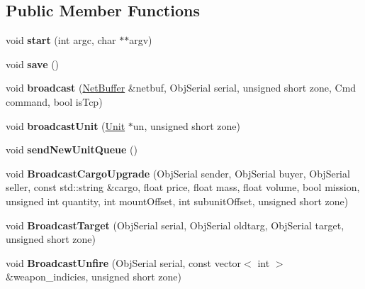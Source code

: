 \subsection*{Public Member Functions}
\begin{DoxyCompactItemize}
\item 
void {\bfseries start} (int argc, char $\ast$$\ast$argv)\hypertarget{classNetServer_aee9eb56b19a071d78e6c2a1ec2e3d8e1}{}\label{classNetServer_aee9eb56b19a071d78e6c2a1ec2e3d8e1}

\item 
void {\bfseries save} ()\hypertarget{classNetServer_a842548b6e1b57b7d67b1345eff098a3c}{}\label{classNetServer_a842548b6e1b57b7d67b1345eff098a3c}

\item 
void {\bfseries broadcast} (\hyperlink{classNetBuffer}{Net\+Buffer} \&netbuf, Obj\+Serial serial, unsigned short zone, Cmd command, bool is\+Tcp)\hypertarget{classNetServer_a2b22e7150100d83f61d56405aefb91c7}{}\label{classNetServer_a2b22e7150100d83f61d56405aefb91c7}

\item 
void {\bfseries broadcast\+Unit} (\hyperlink{classUnit}{Unit} $\ast$un, unsigned short zone)\hypertarget{classNetServer_ae4617ac1961bb0ba10c510c53da711f6}{}\label{classNetServer_ae4617ac1961bb0ba10c510c53da711f6}

\item 
void {\bfseries send\+New\+Unit\+Queue} ()\hypertarget{classNetServer_aca38f088430e71d1ba1c31751a3e11ec}{}\label{classNetServer_aca38f088430e71d1ba1c31751a3e11ec}

\item 
void {\bfseries Broadcast\+Cargo\+Upgrade} (Obj\+Serial sender, Obj\+Serial buyer, Obj\+Serial seller, const std\+::string \&cargo, float price, float mass, float volume, bool mission, unsigned int quantity, int mount\+Offset, int subunit\+Offset, unsigned short zone)\hypertarget{classNetServer_a5f1d92cd0d8fc0ae33d2f4797c855ec8}{}\label{classNetServer_a5f1d92cd0d8fc0ae33d2f4797c855ec8}

\item 
void {\bfseries Broadcast\+Target} (Obj\+Serial serial, Obj\+Serial oldtarg, Obj\+Serial target, unsigned short zone)\hypertarget{classNetServer_a954ea457f78da4e469073c596eab9798}{}\label{classNetServer_a954ea457f78da4e469073c596eab9798}

\item 
void {\bfseries Broadcast\+Unfire} (Obj\+Serial serial, const vector$<$ int $>$ \&weapon\+\_\+indicies, unsigned short zone)\hypertarget{classNetServer_a705fb4e8121cc8bc5087242e5aabd146}{}\label{classNetServer_a705fb4e8121cc8bc5087242e5aabd146}


\end{DoxyCompactItemize}
